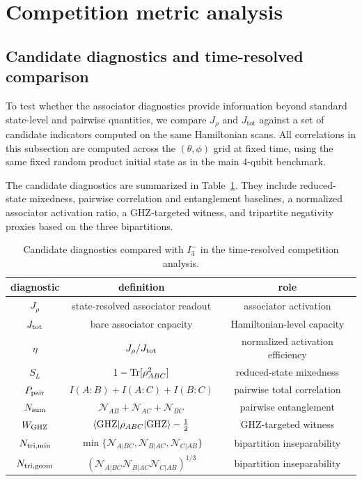 \documentclass[aps,physrev,preprint,groupedaddress]{revtex4-2}
\begin{document}
\section{Competition metric analysis}\label{sm:competition}
\subsection{Candidate diagnostics and time-resolved comparison} \label{sm:competition-diagnostics}

To test whether the associator diagnostics provide information beyond standard state-level and pairwise quantities, we compare $J_{\rho}$ and $J_{\mathrm{tot}}$ against a set of candidate indicators computed on the same Hamiltonian scans. All correlations in this subsection are computed across the $(\theta,\phi)$ grid at fixed time, using the same fixed random product initial state as in the main $4$-qubit benchmark.

The candidate diagnostics are summarized in Table~\ref{tab:candidate_diagnostics}. They include reduced-state mixedness, pairwise correlation and entanglement baselines, a normalized
associator activation ratio, a GHZ-targeted witness, and tripartite negativity proxies based on the three bipartitions.

\begin{table}[h]
\centering
\caption{Candidate diagnostics compared with \(I_3^-\) in the
time-resolved competition analysis.}
\label{tab:candidate_diagnostics}
\begin{tabular}{c|c|c}
\hline
diagnostic & definition & role \\
\hline
\(J_\rho\) & state-resolved associator readout & associator activation \\
\(J_{\rm tot}\) & bare associator capacity & Hamiltonian-level capacity \\
\(\eta\) & \(J_\rho/J_{\rm tot}\) & normalized activation efficiency \\
\(S_L\) & \(1-{\rm Tr}[\rho_{ABC}^2]\) & reduced-state mixedness \\
\(P_{\rm pair}\) & \(I(A:B)+I(A:C)+I(B:C)\) & pairwise total correlation \\
\(N_{\rm sum}\) & \(\mathcal N_{AB}+\mathcal N_{AC}+\mathcal N_{BC}\) & pairwise entanglement \\
\(W_{\rm GHZ}\) & \(\langle{\rm GHZ}|\rho_{ABC}|{\rm GHZ}\rangle-\frac12\) & GHZ-targeted witness \\
\(N_{\rm tri,min}\) & \(\min\{\mathcal N_{A|BC},\mathcal N_{B|AC},\mathcal N_{C|AB}\}\) & bipartition inseparability \\
\(N_{\rm tri,geom}\) & \((\mathcal N_{A|BC}\mathcal N_{B|AC}\mathcal N_{C|AB})^{1/3}\) & bipartition inseparability \\
\hline
\end{tabular}
\end{table}
\end{document}
